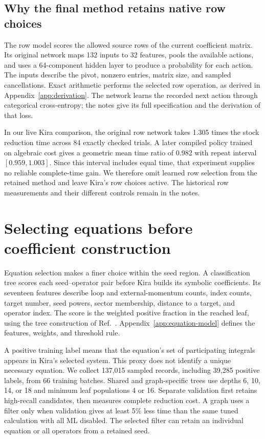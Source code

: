 \documentclass[11pt,a4paper]{article}
\begin{document}
\subsection{Why the final method retains native row choices}
The row model scores the allowed source rows of the current coefficient matrix. Its original network maps 132 inputs to 32 features, pools the available actions, and uses a 64-component hidden layer to produce a probability for each action. The inputs describe the pivot, nonzero entries, matrix size, and sampled cancellations. Exact arithmetic performs the selected row operation, as derived in Appendix~\ref{app:derivation}. The network learns the recorded next action through categorical cross-entropy; the notes give its full specification and the derivation of that loss.

In our live Kira comparison, the original row network takes 1.305 times the stock reduction time across 84 exactly checked trials. A later compiled policy trained on algebraic cost gives a geometric mean time ratio of 0.982 with repeat interval $[0.959,1.003]$. Since this interval includes equal time, that experiment supplies no reliable complete-time gain. We therefore omit learned row selection from the retained method and leave Kira's row choices active. The historical row measurements and their different controls remain in the notes.

\section{Selecting equations before coefficient construction}
\label{sec:equation}
Equation selection makes a finer choice within the seed region. A classification tree scores each seed--operator pair before Kira builds its symbolic coefficients. Its seventeen features describe loop and external-momentum counts, index counts, target number, seed powers, sector membership, distance to a target, and operator index. The score is the weighted positive fraction in the reached leaf, using the tree construction of Ref.~\cite{CART1984}. Appendix~\ref{app:equation-model} defines the features, weights, and threshold rule.

A positive training label means that the equation's set of participating integrals appears in Kira's selected system. This proxy does not identify a unique necessary equation. We collect 137,015 sampled records, including 39,285 positive labels, from 66 training batches. Shared and graph-specific trees use depths 6, 10, 14, or 18 and minimum leaf populations 4 or 16. Separate validation first retains high-recall candidates, then measures complete reduction cost. A graph uses a filter only when validation gives at least 5\% less time than the same tuned calculation with all ML disabled. The selected filter can retain an individual equation or all operators from a retained seed.
\end{document}
